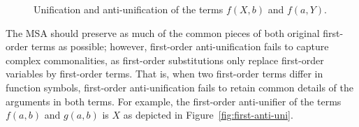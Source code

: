 \begin{figure} [t]
\centering{}
  \caption{Unification and anti-unification of the terms $f(X,b)$ and $f(a,Y)$.}
  \label{fig:uni-anti-uni}
\end{figure}

The MSA should preserve as much of the common pieces of both original first-order terms as possible; however, first-order anti-unification fails to capture complex commonalities, as first-order substitutions only replace first-order variables by first-order terms. That is, when two first-order terms differ in function symbols, first-order anti-unification fails to retain common details of the arguments in both terms. For example, the first-order anti-unifier of the terms $f(a,b)$ and $g(a,b)$ is $X$ as depicted in Figure~\ref{fig:first-anti-uni}.

